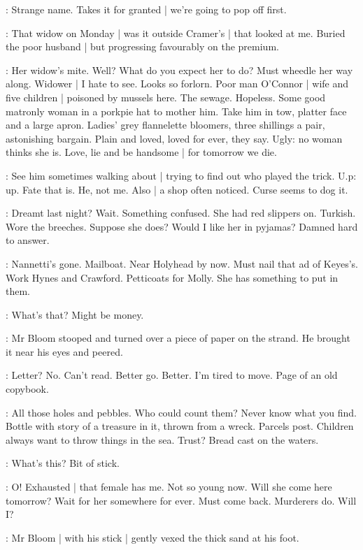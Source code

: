 \BloomAbstract:
Strange name.
Takes it for granted |
we're going to pop off first.

\BloomHist:
That widow on Monday |
was it outside Cramer's |
that looked at me.
Buried the poor husband |
but progressing favourably on the premium.%

\BloomAbstract:
Her widow's mite.
Well?
What do you expect her to do?
Must wheedle her way along.
Widower |
I hate to see.
Looks so forlorn.
Poor man O'Connor |
wife and five children |
poisoned by mussels here.
The sewage.
Hopeless.
Some good matronly woman in a porkpie hat to mother him.
Take him in tow,
platter face and a large apron.
Ladies' grey flannelette bloomers,
three shillings a pair,
astonishing bargain.
Plain and loved,
loved for ever,
they say.
Ugly:
no woman thinks she is.
Love,
lie
and be handsome |
for tomorrow we die.

\BloomToday:
See him sometimes walking about |
trying to find out who played the trick.
U.p:
up.
Fate that is.
He,
not me.
Also |
a shop often noticed.
Curse seems to dog it.

\BloomHist:
Dreamt last night?
Wait.%
Something confused.
She had red slippers on.
Turkish.
Wore the breeches.
Suppose she does?
Would I like her in pyjamas?
Damned hard to answer.

\BloomToday:
Nannetti's gone.
Mailboat.
Near Holyhead by now.
Must nail that ad of Keyes's.
Work Hynes and Crawford.
Petticoats for Molly.
She has something to put in them.

\BloomCurrent:
What's that?
Might be money.

:
Mr Bloom stooped
and turned over a piece of paper
on the strand.
He brought it near his eyes and peered.

\BloomCurrent:
Letter?
No.
Can't read.
Better go.
Better.
I'm tired to move.
Page of an old copybook.

\BloomAbstract:
All those holes and pebbles.
Who could count them?
Never know what you find.
Bottle with story of a treasure in it,
thrown from a wreck.%
Parcels post.
Children always want to throw things in the sea.
Trust?
Bread cast on the waters.

\BloomCurrent:
What's this?
Bit of stick.

\BloomCurrent:
O!
Exhausted |
that female has me.
Not so young now.
Will she come here tomorrow?
Wait for her somewhere for ever.
Must come back.
Murderers do.
Will I?

:
Mr Bloom |
with his stick |
gently vexed the thick sand at his foot.

